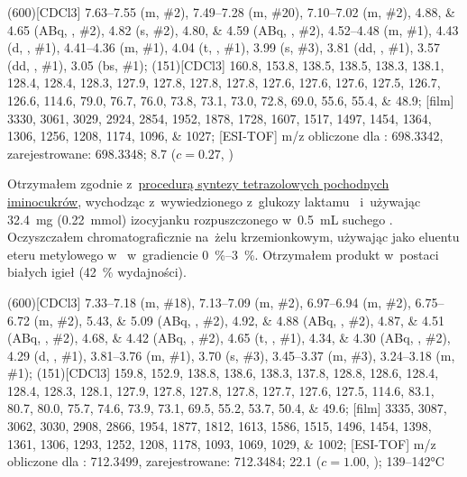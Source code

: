 \begin{fullexp}
  \NMR(600)[CDCl3] \numrange{7.63}{7.55} (m, \#{2}), \numrange{7.49}{7.28} (m, \#{20}), \numrange{7.10}{7.02} (m, \#{2}), \numlist{4.88;4.65} (ABq, , \#{2}), \num{4.82} (s, \#{2}), \numlist{4.80;4.59} (ABq, , \#{2}), \numrange{4.52}{4.48} (m, \#{1}), \num{4.43} (d, , \#{1}), \numrange{4.41}{4.36} (m, \#{1}), \num{4.04} (t, , \#{1}), \num{3.99} (s, \#{3}), \num{3.81} (dd, , \#{1}), \num{3.57} (dd, , \#{1}), \num{3.05} (bs, \#{1});
  (151)[CDCl3] \numlist{160.8; 153.8; 138.5; 138.5; 138.3; 138.1; 128.4; 128.4; 128.3; 127.9; 127.8; 127.8; 127.8; 127.6; 127.6; 127.6; 127.5; 126.7; 126.6; 114.6; 79.0; 76.7; 76.0; 73.8; 73.1; 73.0; 72.8; 69.0; 55.6; 55.4; 48.9};
  [film] \numlist{3330; 3061; 3029; 2924; 2854; 1952; 1878; 1728; 1607; 1517; 1497; 1454; 1364; 1306; 1256; 1208; 1174; 1096; 1027};
  [ESI-TOF] m/z obliczone dla : \num{698.3342}, zarejestrowane: \num{698.3348};
  \data{[$\alpha^{23}_D$]~$=$} \num{8.7} ($c = 0.27$, )
\end{fullexp}

Otrzymałem zgodnie z~\hyperref[experimental:sugars:schwartz]{procedurą syntezy tetrazolowych
  pochodnych iminocukrów}, wychodząc z~wywiedzionego z~glukozy laktamu~
  i~używając \SI{32.4}{\milli\gram} (\SI{0.22}{\milli\mol}) izocyjanku 
  rozpuszczonego w~\SI{0.5}{\milli\liter} suchego .
Oczyszczałem chromatograficznie na~żelu krzemionkowym,
  używając jako eluentu eteru  metylowego w~ w~gradiencie
  \SIrange{0}{3}{\percent}.
Otrzymałem produkt w~postaci białych igieł (\SI{42}{\percent} wydajności).

\begin{fullexp}
  \NMR(600)[CDCl3] \numrange{7.33}{7.18} (m, \#{18}), \numrange{7.13}{7.09} (m, \#{2}), \numrange{6.97}{6.94} (m, \#{2}), \numrange{6.75}{6.72} (m, \#{2}), \numlist{5.43;5.09} (ABq, , \#{2}), \numlist{4.92;4.88} (ABq, , \#{2}), \numlist{4.87;4.51} (ABq, , \#{2}), \numlist{4.68;4.42} (ABq, , \#{2}), \num{4.65} (t, , \#{1}), \numlist{4.34;4.30} (ABq, , \#{2}), \num{4.29} (d, , \#{1}), \numrange{3.81}{3.76} (m, \#{1}), \num{3.70} (s, \#{3}), \numrange{3.45}{3.37} (m, \#{3}), \numrange{3.24}{3.18} (m, \#{1});
  (151)[CDCl3] \numlist{159.8; 152.9; 138.8; 138.6; 138.3; 137.8; 128.8; 128.6; 128.4; 128.4; 128.3; 128.1; 127.9; 127.8; 127.8; 127.8; 127.7; 127.6; 127.5; 114.6; 83.1; 80.7; 80.0; 75.7; 74.6; 73.9; 73.1; 69.5; 55.2; 53.7; 50.4; 49.6};
  [film] \numlist{3335; 3087; 3062; 3030; 2908; 2866; 1954; 1877; 1812; 1613; 1586; 1515; 1496; 1454; 1398; 1361; 1306; 1293; 1252; 1208; 1178; 1093; 1069; 1029; 1002};
  [ESI-TOF] m/z obliczone dla : \num{712.3499}, zarejestrowane: \num{712.3484};
  \data{[$\alpha^{23}_D$]~$=$} \num{22.1} ($c = 1.00$, );
   \numrange{139}{142}\si{\celsius}
\end{fullexp}

